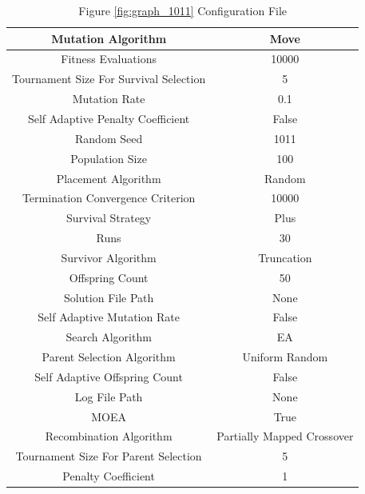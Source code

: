 \documentclass{standalone}
\begin{document}
\clearpage
\begin{table}[!htb]
	\centering
	\caption{Figure \ref{fig:graph_1011} Configuration File}
	\label{tab:graph_1011}
	\begin{tabular}{| c | c |}
		\hline
		Mutation Algorithm		& Move		 \\
		\hline
		Fitness Evaluations		& 10000		 \\
		\hline
		Tournament Size For Survival Selection		& 5		 \\
		\hline
		Mutation Rate		& 0.1		 \\
		\hline
		Self Adaptive Penalty Coefficient		& False		 \\
		\hline
		Random Seed		& 1011		 \\
		\hline
		Population Size		& 100		 \\
		\hline
		Placement Algorithm		& Random		 \\
		\hline
		Termination Convergence Criterion		& 10000		 \\
		\hline
		Survival Strategy		& Plus		 \\
		\hline
		Runs		& 30		 \\
		\hline
		Survivor Algorithm		& Truncation		 \\
		\hline
		Offspring Count		& 50		 \\
		\hline
		Solution File Path		& None		 \\
		\hline
		Self Adaptive Mutation Rate		& False		 \\
		\hline
		Search Algorithm		& EA		 \\
		\hline
		Parent Selection Algorithm		& Uniform Random		 \\
		\hline
		Self Adaptive Offspring Count		& False		 \\
		\hline
		Log File Path		& None		 \\
		\hline
		MOEA		& True		 \\
		\hline
		Recombination Algorithm		& Partially Mapped Crossover		 \\
		\hline
		Tournament Size For Parent Selection		& 5		 \\
		\hline
		Penalty Coefficient		& 1		 \\
		\hline
	\end{tabular}
\end{table}
\end{document}
